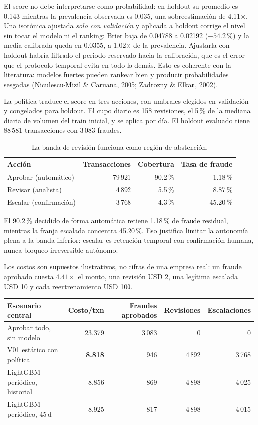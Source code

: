 \documentclass[11pt,letterpaper]{article}
\begin{document}
El score no debe interpretarse como probabilidad: en holdout su promedio es 0.143 mientras la prevalencia observada es 0.035, una sobreestimación de 4.11$\times$. Una isotónica ajustada \emph{solo con validación} y aplicada a holdout corrige el nivel sin tocar el modelo ni el ranking: Brier baja de 0.04788 a 0.02192 ($-54.2$\,\%) y la media calibrada queda en 0.0355, a 1.02$\times$ de la prevalencia. Ajustarla con holdout habría filtrado el periodo reservado hacia la calibración, que es el error que el protocolo temporal evita en todo lo demás. Esto es coherente con la literatura: modelos fuertes pueden rankear bien y producir probabilidades sesgadas (Niculescu-Mizil \& Caruana, 2005; Zadrozny \& Elkan, 2002).

La política traduce el score en tres acciones, con umbrales elegidos en validación y congelados para holdout. El cupo diario es 158 revisiones, el 5\,\% de la mediana diaria de volumen del train inicial, y se aplica por día. El holdout evaluado tiene 88\,581 transacciones con 3\,083 fraudes.

\begin{table}[H]\centering\small
\begin{tabular}{@{}lrrr@{}}\toprule
Acción & Transacciones & Cobertura & Tasa de fraude\\\midrule
Aprobar (automático) & 79\,921 & 90.2\,\% & 1.18\,\%\\
Revisar (analista) & 4\,892 & 5.5\,\% & 8.87\,\%\\
Escalar (confirmación) & 3\,768 & 4.3\,\% & 45.20\,\%\\\bottomrule
\end{tabular}
\caption{La banda de revisión funciona como región de abstención.}
\end{table}

El 90.2\,\% decidido de forma automática retiene 1.18\,\% de fraude residual, mientras la franja escalada concentra 45.20\,\%. Eso justifica limitar la autonomía plena a la banda inferior: escalar es retención temporal con confirmación humana, nunca bloqueo irreversible autónomo.

Los costos son supuestos ilustrativos, no cifras de una empresa real: un fraude aprobado cuesta $4.41\times$ el monto, una revisión USD 2, una legítima escalada USD 10 y cada reentrenamiento USD 100.

\begin{table}[H]\centering\small
\begin{tabular}{@{}lrrrr@{}}\toprule
Escenario central & Costo/txn & Fraudes aprobados & Revisiones & Escalaciones\\\midrule
Aprobar todo, sin modelo & 23.379 & 3\,083 & 0 & 0\\
V01 estático con política & \textbf{8.818} & 946 & 4\,892 & 3\,768\\
LightGBM periódico, historial & 8.856 & 869 & 4\,898 & 4\,025\\
LightGBM periódico, 45\,d & 8.925 & 817 & 4\,898 & 4\,015\\\bottomrule
\end{tabular}
\end{table}
\end{document}
